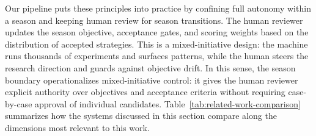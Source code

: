 \documentclass[analytics,article,submit,pdftex,moreauthors]{Definitions/mdpi}
\begin{document}
Our pipeline puts these principles into practice by confining full autonomy within a season and keeping human review for season transitions. The human reviewer updates the season objective, acceptance gates, and scoring weights based on the distribution of accepted strategies. This is a mixed-initiative design: the machine runs thousands of experiments and surfaces patterns, while the human steers the research direction and guards against objective drift. In this sense, the season boundary operationalizes mixed-initiative control: it gives the human reviewer explicit authority over objectives and acceptance criteria without requiring case-by-case approval of individual candidates. Table~\ref{tab:related-work-comparison} summarizes how the systems discussed in this section compare along the dimensions most relevant to this work.
\end{document}
